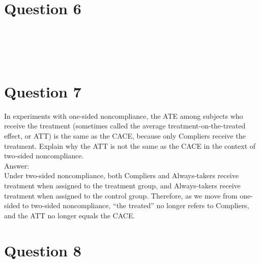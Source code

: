 \documentclass[11pt,notitlepage]{article}\usepackage[]{graphicx}\usepackage[]{color}
\makeatletter
\newenvironment{kframe}{%
 \def\at@end@of@kframe{}%
 \ifinner\ifhmode%
  \def\at@end@of@kframe{\end{minipage}}%
  \begin{minipage}{\columnwidth}%
 \fi\fi%
 \def\FrameCommand##1{\hskip\@totalleftmargin \hskip-\fboxsep
 \colorbox{shadecolor}{##1}\hskip-\fboxsep
     \hskip-\linewidth \hskip-\@totalleftmargin \hskip\columnwidth}%
 \MakeFramed {\advance\hsize-\width
   \@totalleftmargin\z@ \linewidth\hsize
   \@setminipage}}%
 {\par\unskip\endMakeFramed%
 \at@end@of@kframe}
\newenvironment{knitrout}{}{} %
\makeatother
\begin{document}
\section*{Question 6}
\begin{knitrout}
\color{fgcolor}\begin{kframe}
\begin{verbatim}





\end{verbatim}
\end{kframe}
\end{knitrout}


\section*{Question 7}
In experiments with one-sided noncompliance, the ATE among subjects who receive the treatment (sometimes called the average treatment-on-the-treated effect, or ATT) is the same as the CACE, because only Compliers receive the treatment. Explain why the ATT is not the same as the CACE in the context of two-sided noncompliance.\\
Answer:\\
Under two-sided noncompliance, both Compliers and Always-takers receive treatment when assigned to the treatment group, and Always-takers receive treatment when assigned to the control group. Therefore, as we move from one-sided to two-sided noncompliance, ``the treated'' no longer refers to Compliers, and the ATT no longer equals the CACE.

\section*{Question 8}
\begin{knitrout}
\color{fgcolor}\begin{kframe}
\begin{verbatim}





\end{verbatim}
\end{kframe}
\end{knitrout}
\end{document}
